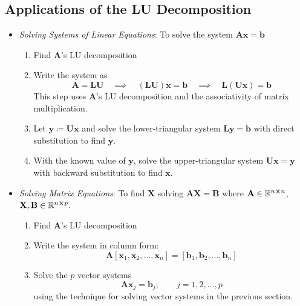 \documentclass[11pt, a4paper]{article}
\newcommand{\R}{\mathbb{R}} %
\newcommand{\mat}[1]{\mathbf{#1}} %
\begin{document}
\subsection{Applications of the LU Decomposition}
\begin{itemize}
	\item \textit{Solving Systems of Linear Equations}: To solve the system $ \mat{A} \bm{x} = \bm{b} $
	\begin{enumerate}
		\item Find $ \mat{A} $'s LU decomposition
		
		\item Write the system as
		\begin{equation*}
			\mat{A} = \mat{L} \mat{U} \quad \implies \quad (\mat{L} \mat{U}) \bm{x} = \bm{b} \quad \implies \quad \mat{L} (\mat{U} \bm{x}) = \bm{b}
		\end{equation*}
		This step uses $ \mat{A} $'s LU decomposition and the associativity of matrix multiplication.
	
	
		\item Let $ \bm{y} \coloneqq \mat{U} \bm{x} $ and solve the lower-triangular system $ \mat{L} \bm{y} = \bm{b} $ with direct substitution to find $ \bm{y} $.
		
		\item With the known value of $ \bm{y} $, solve the upper-triangular system $ \mat{U} \bm{x} = \bm{y} $ with backward substitution to find $ \bm{x} $.
	\end{enumerate}
	
	\item \textit{Solving Matrix Equations}: To find $ \mat{X} $ solving $ \mat{A} \mathbf{X} = \mathbf{B} $ where $ \mat{A} \in \R^{n \cross n} $, $ \mathbf{X}, \mathbf{B} \in \R^{n \cross p} $.
	\begin{enumerate}
		\item Find $ \mat{A} $'s LU decomposition
		
		\item Write the system in column form:
		\begin{equation*}
			\mat{A} [\bm{x}_1, \bm{x}_{2}, \dots, \bm{x}_n] = [\bm{b}_1, \bm{b}_{2}, \dots, \bm{b}_n] 
		\end{equation*}
		
		\item Solve the $ p $ vector systems 
		\begin{equation*}
			\mat{A} \bm{x}_{j} = \bm{b}_{j}; \qquad j = 1, 2, \dots, p
		\end{equation*}
		using the technique for solving vector systems in the previous section.
		

\end{enumerate}
\end{itemize}
\end{document}
